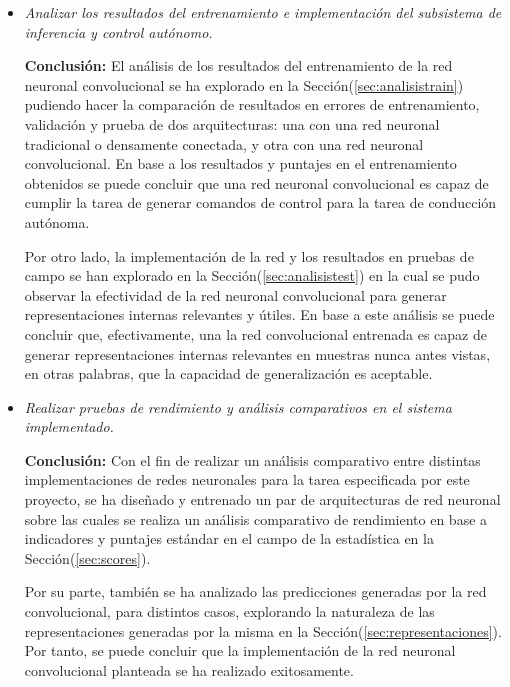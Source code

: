 \begin{itemize}
    \item \textit{Analizar los resultados del entrenamiento e implementación del subsistema de inferencia y control autónomo.}
    
    \textbf{Conclusión:} El análisis de los resultados del entrenamiento de la red neuronal convolucional se ha explorado en 
    la Sección(\ref{sec:analisistrain}) pudiendo hacer la comparación de resultados en errores de entrenamiento, validación 
    y prueba de dos arquitecturas:
    una con una red neuronal tradicional o densamente conectada, y otra con una red neuronal convolucional. En base a los 
    resultados y puntajes en el entrenamiento obtenidos se puede concluir que una red neuronal convolucional es capaz de cumplir la 
    tarea de generar comandos de control para la tarea de conducción autónoma. 

    Por otro lado, la implementación de la red y los resultados en pruebas de campo se han explorado en la 
    Sección(\ref{sec:analisistest}) en la cual 
    se pudo observar la efectividad de la red neuronal convolucional para generar representaciones internas relevantes y útiles. 
    En base a este análisis se puede concluir que, efectivamente, una la red convolucional entrenada es capaz de generar 
    representaciones internas relevantes en muestras nunca antes vistas, en otras palabras, que la capacidad de generalización 
    es aceptable.

    \item \textit{Realizar pruebas de rendimiento y análisis comparativos en el sistema implementado.}
    
    \textbf{Conclusión:} Con el fin de realizar un análisis comparativo entre distintas implementaciones de redes neuronales 
    para la tarea especificada por este proyecto, se ha diseñado y entrenado un par de arquitecturas de red neuronal sobre las 
    cuales se realiza un análisis comparativo de rendimiento en base a indicadores y puntajes estándar en el campo de la estadística
    en la Sección(\ref{sec:scores}). 

    Por su parte, también se ha analizado las predicciones generadas por la red convolucional, para distintos casos, explorando 
    la naturaleza de las representaciones generadas por la misma en la Sección(\ref{sec:representaciones}). Por tanto, se puede 
    concluir que la implementación 
    de la red neuronal convolucional planteada se ha realizado exitosamente.

\end{itemize}

